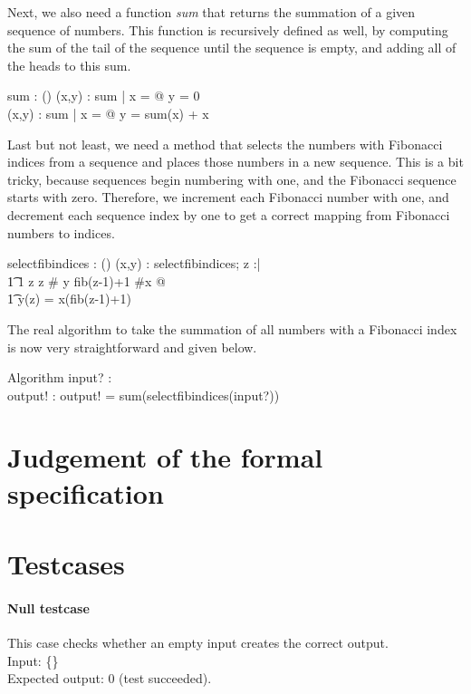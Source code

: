 \documentclass[12pt]{article}
\begin{document}
Next, we also need a function \textit{sum} that returns the summation of a given sequence of numbers. This function is recursively defined as well, by computing the sum of the tail of the sequence until the sequence is empty, and adding all of the heads to this sum.
\begin{axdef}
sum : \power (\seq \real \fun \real)
\where
\forall (x,y) : sum | x = \langle\rangle @ y = 0 \\
\forall (x,y) : sum | x \not = \langle\rangle @ y = sum(\tail x) + \head x
\end{axdef}

Last but not least, we need a method that selects the numbers with Fibonacci indices from a sequence and places those numbers in a new sequence. This is a bit tricky, because sequences begin numbering with one, and the Fibonacci sequence starts with zero. Therefore, we increment each Fibonacci number with one, and decrement each sequence index by one to get a correct mapping from Fibonacci numbers to indices.
\begin{axdef}
selectfibindices : \power (\seq \real \fun \seq \real)
\where
\forall (x,y) : selectfibindices; z :\nat | \\
\t1 1 \leq z \wedge z \leq \# y \wedge fib(z-1)+1 \leq \#x @ \\
\t1 y(z) = x(fib(z-1)+1)
\end{axdef}

The real algorithm to take the summation of all numbers with a Fibonacci index is now very straightforward and given below.
\begin{schema}{Algorithm}
input? : \seq \real \\
output! : \real
\where
output! = sum(selectfibindices(input?))
\end{schema}

\section{Judgement of the formal specification}

\section{Testcases}

\paragraph{Null testcase}
This case checks whether an empty input creates the correct output. \\
Input: \{\} \\
Expected output: 0 (test succeeded).
\end{document}
